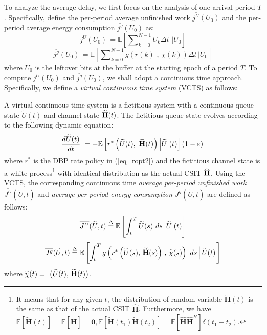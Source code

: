 \documentclass[11pt,journal, onecolumn]{./IEEEtran}
\newcommand{\red}{\color{black}}
\begin{document}
To analyze the average delay, we first focus on the analysis of one arrival period $T$. Specifically, define the per-period average unfinished work $\overline{j^U}(U_0)$ and the per-period average energy consumption $\overline{j^g}(U_0)$ as:
\begin{equation}\label{eq_jUdef}
\overline {{j^U}} ({U_0})\, = \mathbb E\left[ {\sum\nolimits_{k = 0}^{N - 1} {{U_k}\Delta t\,\,\left| {{U_0}} \right.} } \right]
\end{equation}
\begin{equation}\label{eq_jgdef}
\overline {{j^g}} ({U_0})\, = \mathbb E\left[ {\sum\nolimits_{k = 0}^{N - 1} {g\left( {r(k)\,\,,\,\chi (k)} \right)\Delta t} \,\left| {{U_0}} \right.} \right]
\end{equation}
where $U_0$ is the leftover bits at the buffer at the starting epoch of a period $T$. To compute $\overline{j^U}(U_0)$ and $\overline{j^g}(U_0)$, we shall adopt a continuous time approach. Specifically, we define a {\em virtual continuous time system} (VCTS) as follows:
\begin{Definition}
A virtual continuous time system is a fictitious system with a continuous queue state $\widetilde{U}(t)$ and channel state $\widetilde{\bf H}(t)$. The fictitious queue state evolves according to the following dynamic equation:
\begin{equation}\label{eq_ode}
\frac{{d\widetilde U(t)}}{{dt}}\,\, =  - \mathbb E\left[ {{r^*}\left( {\widetilde U(t),\,\,\widetilde {\bf H}(t)} \right)\left| {\widetilde U} \right.(t)} \right](1 - \varepsilon )\,
\end{equation}
where $r^{*}$ is the DBP rate policy in (\ref{eq_ropt2}) and the fictitious channel state is a white process\footnote{\red It means that for any given $t$, the distribution of random variable $\widetilde{\mathbf{H}}(t)$ is the same as that of the actual CSIT $\hat{\mathbf{H}}$. Furthermore, we have
$\mathbb{E}[\widetilde{\mathbf{H}}(t)]=\mathbb{E}[\hat{\mathbf{H}}]=\mathbf{0},
\mathbb{E}[\widetilde{\mathbf{H}}(t_1)\widetilde{\mathbf{H}}(t_2)]=\mathbb{E}[\hat{\mathbf{H}}\hat{\mathbf{H}}^H]\delta(t_1-t_2)$.} with identical distribution as the actual CSIT $\widehat{\bf H}$. Using the VCTS, the corresponding continuous time \emph{average per-period unfinished work} $\overline {{J^U}}(\widetilde U,t)$ and \emph{average per-period energy consumption} $\overline {{J^g}}(\widetilde U,t)$ are defined as follows:
\begin{equation}\label{def_JU}
\overline {{J^U}} (\widetilde U,t) \buildrel \Delta \over = \mathbb E\left[ {\int_t^T {\widetilde U(s)\,\,ds} \left| {\widetilde U} \right.(t)} \right]
\end{equation}
\begin{equation}\label{def_Jg}
\overline {{J^g}} (\widetilde U,t) \buildrel \Delta \over = \mathbb E\left[ {\int_t^T {g\left( {{r^*}\left( {\widetilde U(s),\,\widetilde{\bf{H}}(s)} \right)\,,\,\widetilde\chi (s)} \right)\,\,ds} \left| {\,\widetilde U(t)} \right.} \right]
\end{equation}
where $\widetilde\chi (t) = \,\,\big( {\widetilde U(t),\,\widetilde{\bf{H}}(t)} \big)$. ~\hfill\IEEEQED
\end{Definition}
\end{document}
